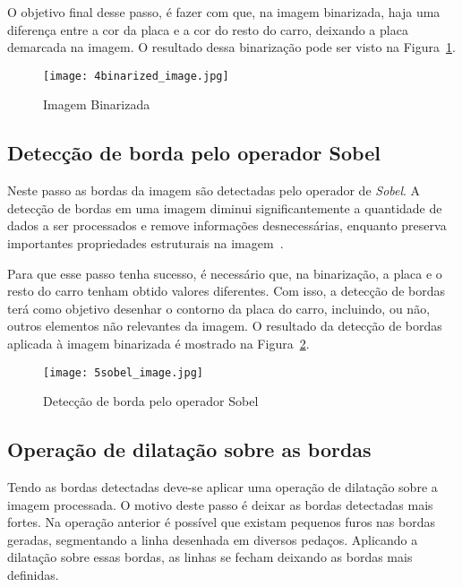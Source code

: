 O objetivo final desse passo, é fazer com que, na imagem binarizada, haja uma diferença entre a cor da placa e a cor do resto do carro, deixando a placa demarcada na imagem. O resultado dessa binarização pode ser visto na Figura~\ref{fig:ext_binarized_image}.

\begin{figure}[H]
	\centering
	\texttt{[image: 4binarized\_image.jpg]}
	\caption{Imagem Binarizada}
	\label{fig:ext_binarized_image}
\end{figure}

\subsection{Detecção de borda pelo operador Sobel}
\label{sec:detec_bordas}

Neste passo as bordas da imagem são detectadas pelo operador de \emph{Sobel}. A detecção de bordas em uma imagem diminui significantemente a quantidade de dados a ser processados e remove informações desnecessárias, enquanto preserva importantes propriedades estruturais na imagem~\cite{ha2016license}.

Para que esse passo tenha sucesso, é necessário que, na binarização, a placa e o resto do carro tenham obtido valores diferentes. Com isso, a detecção de bordas terá como objetivo desenhar o contorno da placa do carro, incluindo, ou não, outros elementos não relevantes da imagem. O resultado da detecção de bordas aplicada à imagem binarizada é mostrado na Figura~\ref{fig:ext_edge_detection_sobel}.

\begin{figure}[H]
	\centering
	\texttt{[image: 5sobel\_image.jpg]}
	\caption{Detecção de borda pelo operador Sobel}
	\label{fig:ext_edge_detection_sobel}
\end{figure}

\subsection{Operação de dilatação sobre as bordas}

Tendo as bordas detectadas deve-se aplicar uma operação de dilatação sobre a imagem processada. O motivo deste passo é deixar as bordas detectadas mais fortes. Na operação anterior é possível que existam pequenos furos nas bordas geradas, segmentando a linha desenhada em diversos pedaços. Aplicando a dilatação sobre essas bordas, as linhas se fecham deixando as bordas mais definidas.

